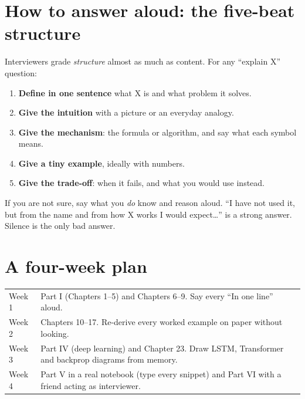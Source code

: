 \section*{How to answer aloud: the five-beat structure}
Interviewers grade \emph{structure} almost as much as content. For any ``explain X'' question:
\begin{enumerate}
\item \textbf{Define in one sentence} what X is and what problem it solves.
\item \textbf{Give the intuition} with a picture or an everyday analogy.
\item \textbf{Give the mechanism}: the formula or algorithm, and say what each symbol means.
\item \textbf{Give a tiny example}, ideally with numbers.
\item \textbf{Give the trade-off}: when it fails, and what you would use instead.
\end{enumerate}
If you are not sure, say what you \emph{do} know and reason aloud. ``I have not used it, but from the name
and from how X works I would expect\dots'' is a strong answer. Silence is the only bad answer.

\section*{A four-week plan}
\begin{center}\small
\begin{tabularx}{\linewidth}{l X}
\toprule
Week 1 & Part I (Chapters 1--5) and Chapters 6--9. Say every ``In one line'' aloud.\\
Week 2 & Chapters 10--17. Re-derive every worked example on paper without looking.\\
Week 3 & Part IV (deep learning) and Chapter 23. Draw LSTM, Transformer and backprop diagrams from memory.\\
Week 4 & Part V in a real notebook (type every snippet) and Part VI with a friend acting as interviewer.\\
\bottomrule
\end{tabularx}
\end{center}
